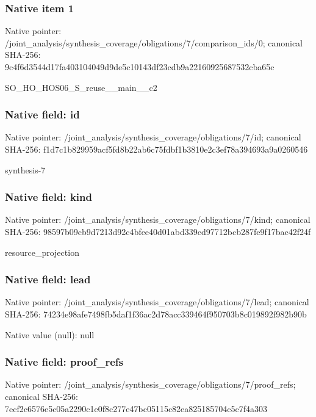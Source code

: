 \documentclass[10pt,a4paper]{article}
\begin{document}
\subsubsection{Native item 1}
Native pointer: /joint\_\allowbreak{}analysis/synthesis\_\allowbreak{}coverage/obligations/7/comparison\_\allowbreak{}ids/0; canonical SHA-256: 9c4f6d3544d17fa403104049d9de5c10143df23cdb9a22160925687532cba65c

\begingroup\raggedright\sloppy SO\_\allowbreak{}HO\_\allowbreak{}HOS06\_\allowbreak{}S\_\allowbreak{}reuse\_\allowbreak{}\_\allowbreak{}main\_\allowbreak{}\_\allowbreak{}c2\par\endgroup

\subsubsection{Native field: id}
Native pointer: /joint\_\allowbreak{}analysis/synthesis\_\allowbreak{}coverage/obligations/7/id; canonical SHA-256: f1d7c1b829959acf5fd8b22ab6c75fdbf1b3810e2c3ef78a394693a9a0260546

\begingroup\raggedright\sloppy synthesis-7\par\endgroup

\subsubsection{Native field: kind}
Native pointer: /joint\_\allowbreak{}analysis/synthesis\_\allowbreak{}coverage/obligations/7/kind; canonical SHA-256: 98597b09cb9d7213d92c4bfee40d01abd339cd97712bcb287fe9f17bac42f24f

\begingroup\raggedright\sloppy resource\_\allowbreak{}projection\par\endgroup

\subsubsection{Native field: lead}
Native pointer: /joint\_\allowbreak{}analysis/synthesis\_\allowbreak{}coverage/obligations/7/lead; canonical SHA-256: 74234e98afe7498fb5daf1f36ac2d78acc339464f950703b8c019892f982b90b

Native value (null): null

\subsubsection{Native field: proof\_\allowbreak{}refs}
Native pointer: /joint\_\allowbreak{}analysis/synthesis\_\allowbreak{}coverage/obligations/7/proof\_\allowbreak{}refs; canonical SHA-256: 7ecf2c6576e5c05a2290c1e0f8c277e47bc05115c82ea825185704c5c7f4a303
\end{document}
